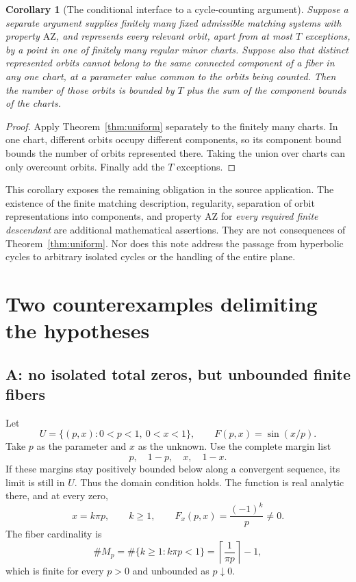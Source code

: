 \documentclass[11pt]{article}
\newtheorem{corollary}[theorem]{Corollary}
\theoremstyle{definition}
\theoremstyle{remark}
\newcommand{\AZ}{\mathrm{AZ}}
\begin{document}
\begin{corollary}[The conditional interface to a cycle-counting argument]
\label{cor:interface}
Suppose a separate argument supplies finitely many fixed admissible
matching systems with property \(\AZ\), and represents every relevant
orbit, apart from at most \(T\) exceptions, by a point in one of
finitely many regular minor charts. Suppose also that distinct
represented orbits cannot belong to the same connected component
of a fiber in any one chart, at a parameter value common to the
orbits being counted. Then the number of those orbits is bounded
by \(T\) plus the sum of the component bounds of the charts.
\end{corollary}

\begin{proof}
Apply Theorem~\ref{thm:uniform} separately to the finitely many
charts. In one chart, different orbits occupy different components,
so its component bound bounds the number of orbits represented
there. Taking the union over charts can only overcount orbits.
Finally add the \(T\) exceptions.
\end{proof}

This corollary exposes the remaining obligation in the source
application. The existence of the finite matching description,
regularity, separation of orbit representations into components,
and property \(\AZ\) for \emph{every required finite descendant}
are additional mathematical assertions. They are not consequences
of Theorem~\ref{thm:uniform}. Nor does this note address the passage
from hyperbolic cycles to arbitrary isolated cycles or the handling
of the entire plane.

\section{Two counterexamples delimiting the hypotheses}
\label{sec:counterexamples}

\subsection{A: no isolated total zeros, but unbounded finite fibers}
\label{subsec:example-a}

Let
\[
 U=\{(p,x):0<p<1,\ 0<x<1\},\qquad
 F(p,x)=\sin(x/p).
\]
Take \(p\) as the parameter and \(x\) as the unknown. Use the complete
margin list
\[
 p,\quad1-p,\quad x,\quad1-x.
\]
If these margins stay positively bounded below along a convergent
sequence, its limit is still in \(U\). Thus the domain condition
holds. The function is real analytic there, and at every zero,
\[
 x=k\pi p,\qquad k\ge1,\qquad
 F_x(p,x)=\frac{(-1)^k}{p}\ne0.
\]
The fiber cardinality is
\[
 \#M_p=\#\{k\ge1:k\pi p<1\}
       =\left\lceil\frac1{\pi p}\right\rceil-1,
\]
which is finite for every \(p>0\) and unbounded as \(p\downarrow0\).
\end{document}
